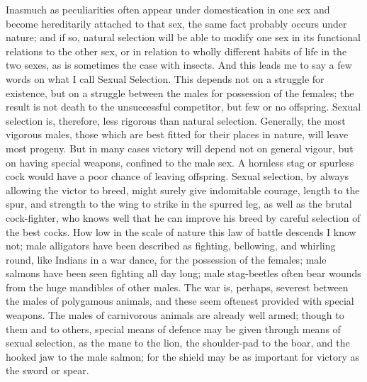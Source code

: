 \darwinpair
{Inasmuch as peculiarities often appear under domestication in one sex and become hereditarily attached to that sex, the same fact probably occurs under nature; and if so, natural selection will be able to modify one sex in its functional relations to the other sex, or in relation to wholly different habits of life in the two sexes, as is sometimes the case with insects. And this leads me to say a few words on what I call Sexual Selection. This depends not on a struggle for existence, but on a struggle between the males for possession of the females; the result is not death to the unsuccessful competitor, but few or no offspring. Sexual selection is, therefore, less rigorous than natural selection. Generally, the most vigorous males, those which are best fitted for their places in nature, will leave most progeny. But in many cases victory will depend not on general vigour, but on having special weapons, confined to the male sex. A hornless stag or spurless cock would have a poor chance of leaving offspring. Sexual selection, by always allowing the victor to breed, might surely give indomitable courage, length to the spur, and strength to the wing to strike in the spurred leg, as well as the brutal cock-fighter, who knows well that he can improve his breed by careful selection of the best cocks. How low in the scale of nature this law of battle descends I know not; male alligators have been described as fighting, bellowing, and whirling round, like Indians in a war dance, for the possession of the females; male salmons have been seen fighting all day long; male stag-beetles often bear wounds from the huge mandibles of other males. The war is, perhaps, severest between the males of polygamous animals, and these seem oftenest provided with special weapons. The males of carnivorous animals are already well armed; though to them and to others, special means of defence may be given through means of sexual selection, as the mane to the lion, the shoulder-pad to the boar, and the hooked jaw to the male salmon; for the shield may be as important for victory as the sword or spear.}
